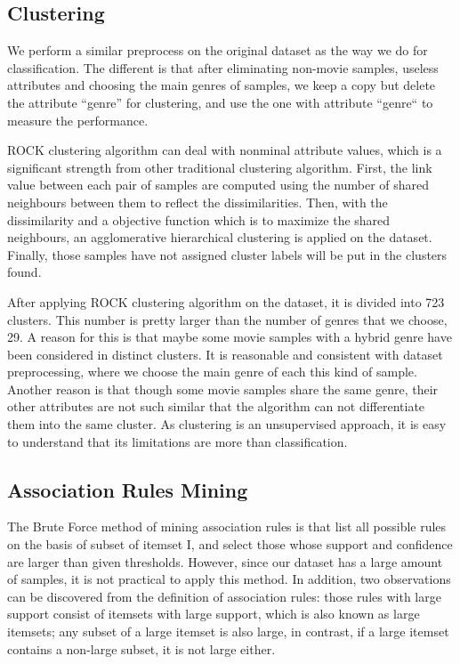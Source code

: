 \documentclass[conference]{IEEEtran}
\begin{document}
\subsection{Clustering}
We perform a similar preprocess on the original dataset as the way we do for classification. The different is that after eliminating non-movie samples, useless attributes and choosing the main genres of samples, we keep a copy but delete the attribute “genre” for clustering, and use the one with attribute “genre“ to measure the performance.

ROCK clustering algorithm can deal with nonminal attribute values, which is a significant strength from other traditional clustering algorithm. First, the link value between each pair of samples are computed using the number of shared neighbours between them to reflect the dissimilarities. Then, with the dissimilarity and a objective function which is to maximize the shared neighbours, an agglomerative hierarchical clustering is applied on the dataset. Finally, those samples have not assigned cluster labels will be put in the clusters found.

After applying ROCK clustering algorithm on the dataset, it is divided into 723 clusters. This number is pretty larger than the number of genres that we choose, 29. A reason for this is that maybe some movie samples with a hybrid genre have been considered in distinct clusters. It is reasonable and consistent with dataset preprocessing, where we choose the main genre of each this kind of sample. Another reason is that though some movie samples share the same genre, their other attributes are not such similar that the algorithm can not differentiate them into the same cluster. As clustering is an unsupervised approach, it is easy to understand that its limitations are more than classification.

\subsection{Association Rules Mining}
The Brute Force method of mining association rules is that list all possible rules on the basis of subset of itemset I, and select those whose support and confidence are larger than given thresholds. However, since our dataset has a large amount of samples, it is not practical to apply this method. In addition, two observations can be discovered from the definition of association rules: those rules with large support consist of itemsets with large support, which is also known as large itemsets; any subset of a large itemset is also large, in contrast, if a large itemset contains a non-large subset, it is not large either.
\end{document}

